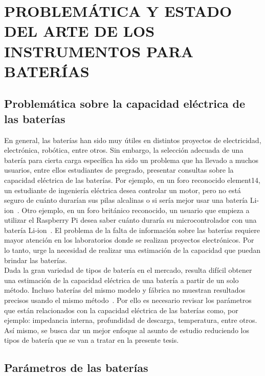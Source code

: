 \chapter{ PROBLEMÁTICA Y ESTADO DEL ARTE DE LOS INSTRUMENTOS PARA BATERÍAS}
\section{Problemática sobre la capacidad eléctrica de las baterías}

En general, las baterías han sido muy útiles en distintos proyectos de electricidad, electrónica, robótica, entre otros. Sin embargo, la selección adecuada de una batería para cierta carga específica ha sido un problema que ha llevado a muchos usuarios, entre ellos estudiantes de pregrado, presentar consultas sobre la capacidad eléctrica de las baterías. Por ejemplo, en un foro reconocido element14, un estudiante de ingeniería eléctrica desea controlar un motor, pero no está seguro de cuánto durarían sus pilas alcalinas o si sería mejor usar una batería Li-ion~\cite{Mparmpas}. Otro ejemplo, en un foro británico reconocido, un usuario que empieza a utilizar el Raspberry Pi desea saber cuánto duraría su microcontrolador con una batería Li-ion~\cite{Elieteyssedou}. El problema de la falta de información sobre las baterías requiere mayor atención en los laboratorios donde se realizan proyectos electrónicos. Por lo tanto, urge la necesidad de realizar una estimación de la capacidad que puedan brindar las baterías. \\

Dada la gran variedad de tipos de batería en el mercado, resulta difícil obtener una estimación de la capacidad eléctrica de una batería a partir de un solo método. Incluso baterías del mismo modelo y fábrica no muestran resultados precisos usando el mismo método~\cite{Buchmann2011}. Por ello es necesario revisar los parámetros que están relacionados con la capacidad eléctrica de las baterías como, por ejemplo: impedancia interna, profundidad de descarga, temperatura, entre otros. Así mismo, se busca dar un mejor enfoque al asunto de estudio reduciendo los tipos de batería que se van a tratar en la presente tesis.

\section{Parámetros de las baterías}

